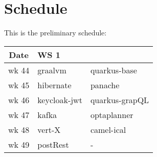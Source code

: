 \clearpage
\section*{Schedule}

This is the preliminary schedule:

\begin{center}
  \begin{tabular}{|c|l|l|}\hline
    \textbf{Date}& \textbf{WS 1}\\\hline
    wk 44 & graalvm & quarkus-base\\\hline
    wk 45 & hibernate & panache\\\hline
    wk 46 & keycloak-jwt & quarkus-grapQL\\\hline
    wk 47 & kafka & optaplanner\\\hline
    wk 48 & vert-X & camel-ical \\\hline
    wk 49 & postRest & - \\\hline
  \end{tabular}
\end{center}

